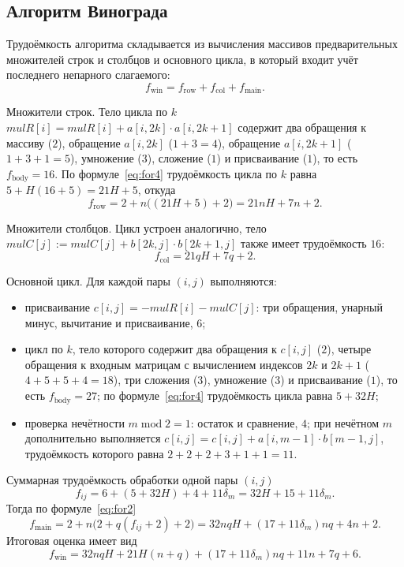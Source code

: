 \documentclass{bmstu}
\begin{document}
\subsection{Алгоритм Винограда}
Трудоёмкость алгоритма складывается из вычисления массивов предварительных
множителей строк и столбцов и основного цикла, в который входит учёт
последнего непарного слагаемого:
\begin{equation}
	f_{\mathrm{win}}=f_{\mathrm{row}}+f_{\mathrm{col}}+f_{\mathrm{main}}.
\end{equation}

Множители строк. Тело цикла по $k$
$\mathit{mulR}[i] = \mathit{mulR}[i] + a[i,2k]\cdot a[i,2k+1]$
содержит два обращения к массиву ($2$), обращение $a[i,2k]$ ($1+3=4$),
обращение $a[i,2k+1]$ ($1+3+1=5$), умножение ($3$), сложение ($1$) и
присваивание ($1$), то есть $f_{\mathrm{body}}=16$. По
формуле~\eqref{eq:for4} трудоёмкость цикла по $k$ равна
$5+H(16+5)=21H+5$, откуда
\begin{equation}
	f_{\mathrm{row}}=2+n\bigl((21H+5)+2\bigr)=21nH+7n+2.
\end{equation}

Множители столбцов. Цикл устроен аналогично, тело
$\mathit{mulC}[j] := \mathit{mulC}[j] + b[2k,j]\cdot b[2k+1,j]$
также имеет трудоёмкость $16$:
\begin{equation}
	f_{\mathrm{col}}=21qH+7q+2.
\end{equation}

Основной цикл. Для каждой пары $(i,j)$ выполняются:
\begin{itemize}
	\item присваивание $c[i,j] = -\mathit{mulR}[i] - \mathit{mulC}[j]$:
	      три обращения, унарный минус, вычитание и присваивание, $6$;
	\item цикл по $k$, тело которого содержит два обращения к $c[i,j]$
	      ($2$), четыре обращения к входным матрицам с вычислением индексов
	      $2k$ и $2k+1$ ($4+5+5+4=18$), три сложения ($3$), умножение ($3$)
	      и присваивание ($1$), то есть $f_{\mathrm{body}}=27$; по
	      формуле~\eqref{eq:for4} трудоёмкость цикла равна $5+32H$;
	\item проверка нечётности $m \;\mathrm{mod}\; 2 = 1$: остаток и
	      сравнение, $4$; при нечётном $m$ дополнительно выполняется
	      $c[i,j] = c[i,j] + a[i,m-1]\cdot b[m-1,j]$,
	      трудоёмкость которого равна $2+2+2+3+1+1=11$.
\end{itemize}
Суммарная трудоёмкость обработки одной пары $(i,j)$
\begin{equation}
	f_{ij}=6+(5+32H)+4+11\delta_m=32H+15+11\delta_m.
\end{equation}
Тогда по формуле~\eqref{eq:for2}
\begin{equation}
	f_{\mathrm{main}}=2+n\bigl(2+q(f_{ij}+2)+2\bigr)=
	32nqH+(17+11\delta_m)nq+4n+2.
\end{equation}
Итоговая оценка имеет вид
\begin{equation}
	\label{eq:win}
	f_{\mathrm{win}}=32nqH+21H(n+q)+(17+11\delta_m)nq+11n+7q+6.
\end{equation}
\end{document}
